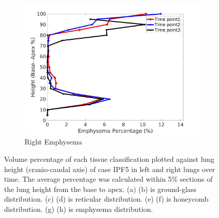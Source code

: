 \begin{figure}[H]
\begin{subfigure}{.42\linewidth}
  \includegraphics[width=\linewidth,trim={{.0\wd0} {.0\wd0} {.0\wd0} {.0\wd0}},clip]{Appendix/Image_AppexA/BaseToApex/IPF5RightLungEmphysemaDiseaseAgainstHeight.jpg}
  \caption{Right Emphysema}
  \label{fig:IPF5DiseaseAgainstHeight-h}
\end{subfigure}
\caption{Volume percentage of each tissue classification plotted against lung height (cranio-caudal axis) of case IPF5 in left and right lungs over time. The average percentage was calculated within 5\% sections of the lung height from the base to apex. (a) (b) is ground-glass distribution. (c) (d) is reticular distribution. (e) (f) is honeycomb distribution. (g) (h) is emphysema distribution.}
\label{fig:IPF5DiseaseAgainstHeight}
\end{figure}

